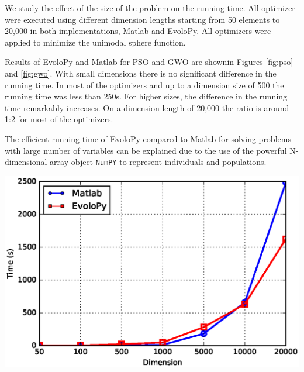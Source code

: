 \documentclass[landscape,a0paper,fontscale=0.285]{baposter} %
\begin{document}
\begin{poster}
{\begin{multicols}{2}
 We study the effect of the size of the problem on the running time. All optimizer were executed using different dimension lengths starting from 50 elements to 20,000 in both implementations, Matlab and EvoloPy. All optimizers were applied to minimize the unimodal sphere function.
 
 Results of EvoloPy and Matlab for PSO and GWO are shownin Figures \ref{fig:pso} and
\ref{fig:gwo}. With small dimensions there is no significant difference in the running time. In most of the optimizers and up to a dimension size of 500  the running time was less than 250s. For higher sizes, the difference in the running time remarkably increases. On a dimension length of 20,000 the ratio is
around 1:2 for most of the optimizers. 

The efficient running time of EvoloPy compared to Matlab
for solving problems with large number of
variables can be explained due to the use of the powerful
N-dimensional array object \texttt{NumPY} to represent individuals and
populations. 









\end{multicols}


\begin{multicols}{2}
\vspace{1em}

\begin{center}
\includegraphics[width=0.95\linewidth]{PSO}
\label{fig:pso}
\end{center}



\end{multicols}}
\end{poster}
\end{document}
